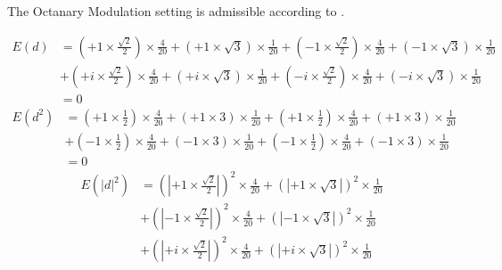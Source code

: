 \begin{Prop}
	The Octanary Modulation setting is admissible according to \cite{Candes2014}. 
	
\end{Prop}

\begin{Proof}
	\begin{equation*}
		\begin{split}
		E(d) &= \left(+1 \times \frac{\sqrt{2}}{2}\right) \times \frac{4}{20} + \left(+1 \times \sqrt{3}\right) \times \frac{1}{20}+\left(-1 \times \frac{\sqrt{2}}{2}\right) \times \frac{4}{20}+\left(-1 \times \sqrt{3}\right) \times \frac{1}{20}\\
		     &+ \left(+i \times \frac{\sqrt{2}}{2}\right) \times \frac{4}{20} + \left(+i \times \sqrt{3}\right) \times \frac{1}{20}+\left(-i \times \frac{\sqrt{2}}{2}\right) \times \frac{4}{20}+\left(-i \times \sqrt{3}\right) \times \frac{1}{20}\\ 
			 &= 0
		\end{split}
	  \end{equation*}
	  \begin{equation*}
		\begin{split}
		E(d^2) &= \left(+1 \times \frac{1}{2}\right) \times \frac{4}{20} + \left(+1 \times 3\right) \times \frac{1}{20}+\left(+1 \times \frac{1}{2}\right) \times \frac{4}{20}+\left(+1 \times 3\right) \times \frac{1}{20}\\
		     &+ \left(-1 \times \frac{1}{2}\right) \times \frac{4}{20} + \left(-1 \times 3\right) \times \frac{1}{20}+\left(-1 \times \frac{1}{2}\right) \times \frac{4}{20}+\left(-1 \times 3\right) \times \frac{1}{20}\\ 
			 &= 0
		\end{split}
	 \end{equation*}
	 \begin{equation*}
		\begin{split}
		E(\left|d\right|^2) &= \left(\left|+1 \times \frac{\sqrt{2}}{2} \right|\right)^2\times \frac{4}{20} + \left(\left|+1 \times \sqrt{3}\right|\right)^2\times \frac{1}{20}\\
		                    &+\left(\left|-1 \times \frac{\sqrt{2}}{2}\right|\right)^2\times \frac{4}{20}+\left(\left|-1 \times \sqrt{3}\right|\right)^2\times \frac{1}{20}\\
		                    &+ \left(\left|+i \times \frac{\sqrt{2}}{2}\right|\right)^2\times \frac{4}{20} + \left(\left|+i \times \sqrt{3}\right|\right)^2\times \frac{1}{20}\\

\end{split}
\end{equation*}
\end{Proof}
